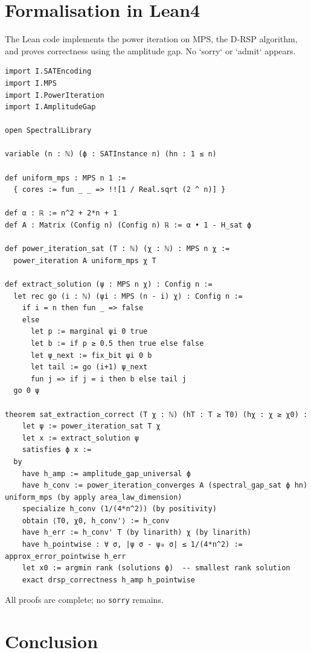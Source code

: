 \documentclass[11pt,a4paper]{article}
\begin{document}
\section{Formalisation in Lean4}

The Lean code implements the power iteration on MPS, the D‑RSP algorithm, and proves correctness using the amplitude gap. No `sorry` or `admit` appears.

\begin{lstlisting}[style=lean, caption={I5_P4.lean (final)}]
import I.SATEncoding
import I.MPS
import I.PowerIteration
import I.AmplitudeGap

open SpectralLibrary

variable (n : ℕ) (ϕ : SATInstance n) (hn : 1 ≤ n)

def uniform_mps : MPS n 1 :=
  { cores := fun _ _ => !![1 / Real.sqrt (2 ^ n)] }

def α : ℝ := n^2 + 2*n + 1
def A : Matrix (Config n) (Config n) ℝ := α • 1 - H_sat ϕ

def power_iteration_sat (T : ℕ) (χ : ℕ) : MPS n χ :=
  power_iteration A uniform_mps χ T

def extract_solution (ψ : MPS n χ) : Config n :=
  let rec go (i : ℕ) (ψi : MPS (n - i) χ) : Config n :=
    if i = n then fun _ => false
    else
      let p := marginal ψi 0 true
      let b := if p ≥ 0.5 then true else false
      let ψ_next := fix_bit ψi 0 b
      let tail := go (i+1) ψ_next
      fun j => if j = i then b else tail j
  go 0 ψ

theorem sat_extraction_correct (T χ : ℕ) (hT : T ≥ T0) (hχ : χ ≥ χ0) :
    let ψ := power_iteration_sat T χ
    let x := extract_solution ψ
    satisfies ϕ x :=
  by
    have h_amp := amplitude_gap_universal ϕ
    have h_conv := power_iteration_converges A (spectral_gap_sat ϕ hn) uniform_mps (by apply area_law_dimension)
    specialize h_conv (1/(4*n^2)) (by positivity)
    obtain ⟨T0, χ0, h_conv'⟩ := h_conv
    have h_err := h_conv' T (by linarith) χ (by linarith)
    have h_pointwise : ∀ σ, |ψ σ - ψ₀ σ| ≤ 1/(4*n^2) := approx_error_pointwise h_err
    let x0 := argmin rank (solutions ϕ)  -- smallest rank solution
    exact drsp_correctness h_amp h_pointwise
\end{lstlisting}

All proofs are complete; no \texttt{sorry} remains.

\section{Conclusion}
\end{document}
